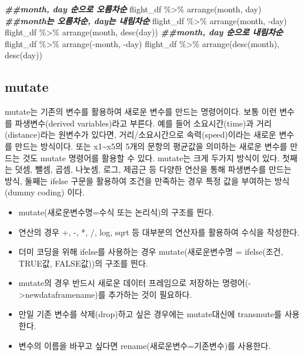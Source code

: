 \documentclass[
]{book}
\newenvironment{Shaded}{\begin{snugshade}}{\end{snugshade}}
\newcommand{\DocumentationTok}[1]{\textcolor[rgb]{0.56,0.35,0.01}{\textbf{\textit{#1}}}}
\newcommand{\FunctionTok}[1]{\textcolor[rgb]{0.00,0.00,0.00}{#1}}
\newcommand{\NormalTok}[1]{#1}
\newcommand{\SpecialCharTok}[1]{\textcolor[rgb]{0.00,0.00,0.00}{#1}}
\providecommand{\tightlist}{%
  \setlength{\itemsep}{0pt}\setlength{\parskip}{0pt}}
\theoremstyle{definition}
\theoremstyle{definition}
\theoremstyle{definition}
\theoremstyle{definition}
\theoremstyle{remark}
\begin{document}
\begin{Shaded}
\begin{Highlighting}[]

\DocumentationTok{\#\#month, day 순으로 오름차순}
\NormalTok{flight\_df }\SpecialCharTok{\%\textgreater{}\%}
  \FunctionTok{arrange}\NormalTok{(month, day) }
\DocumentationTok{\#\#month는 오름차순, day는 내림차순}
\NormalTok{flight\_df }\SpecialCharTok{\%\textgreater{}\%}
  \FunctionTok{arrange}\NormalTok{(month, }\SpecialCharTok{{-}}\NormalTok{day) }
\NormalTok{flight\_df }\SpecialCharTok{\%\textgreater{}\%}
  \FunctionTok{arrange}\NormalTok{(month, }\FunctionTok{desc}\NormalTok{(day))}
\DocumentationTok{\#\#month, day 순으로 내림차순}
\NormalTok{flight\_df }\SpecialCharTok{\%\textgreater{}\%}
  \FunctionTok{arrange}\NormalTok{(}\SpecialCharTok{{-}}\NormalTok{month, }\SpecialCharTok{{-}}\NormalTok{day) }
\NormalTok{flight\_df }\SpecialCharTok{\%\textgreater{}\%}
  \FunctionTok{arrange}\NormalTok{(}\FunctionTok{desc}\NormalTok{(month), }\FunctionTok{desc}\NormalTok{(day))}
\end{Highlighting}
\end{Shaded}

\hypertarget{mutate}{%
\subsection{mutate}\label{mutate}}

mutate는 기존의 변수를 활용하여 새로운 변수를 만드는 명령어이다. 보통 이런 변수를 파생변수(derived variables)라고 부른다. 예를 들어 소요시간(time)과 거리(distance)라는 원변수가 있다면, 거리/소요시간으로 속력(speed)이라는 새로운 변수를 만드는 방식이다. 또는 x1\textasciitilde x5의 5개의 문항의 평균값을 의미하는 새로운 변수를 만드는 것도 mutate 명령어를 활용할 수 있다. mutate는 크게 두가지 방식이 있다. 첫째는 덧셈, 뺄셈, 곱셈, 나눗셈, 로그, 제곱근 등 다양한 연산을 통해 파생변수를 만드는 방식, 둘째는 ifelse 구문을 활용하여 조건을 만족하는 경우 특정 값을 부여하는 방식(dummy coding) 이다.

\begin{itemize}
\tightlist
\item
  mutate(새로운변수명=수식 또는 논리식)의 구조를 띈다.
\item
  연산의 경우 +, -, *, /, log, sqrt 등 대부분의 연산자를 활용하여 수식을 작성한다.
\item
  더미 코딩을 위해 ifelse를 사용하는 경우 mutate(새로운변수명 = ifelse(조건, TRUE값, FALSE값))의 구조를 띈다.
\item
  mutate의 경우 반드시 새로운 데이터 프레임으로 저장하는 명령어(-\textgreater newdataframename)를 추가하는 것이 필요하다.
\item
  만일 기존 변수를 삭제(drop)하고 싶은 경우에는 mutate대신에 transmute를 사용한다.
\item
  변수의 이름을 바꾸고 싶다면 rename(새로운변수=기존변수)를 사용한다.
\end{itemize}
\end{document}
